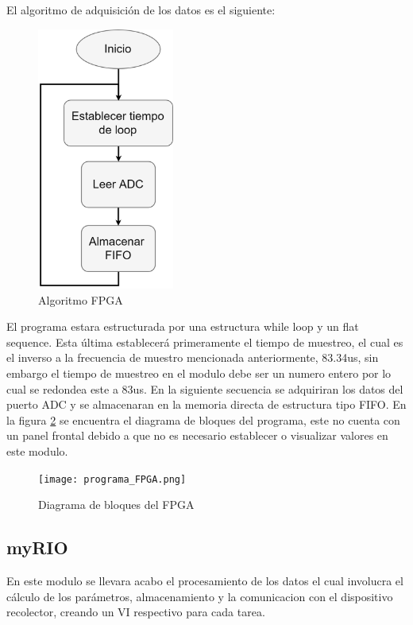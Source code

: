     \par El algoritmo de adquisición de los datos es el siguiente:
    \begin{figure}[H]
        \centering
        \includegraphics[width=0.4\textwidth]{../Imagenes/Algoritmo_FPGA.png}
        \caption{Algoritmo FPGA}
        \label{fig:Algo_FPGA}
    \end{figure}

    \par El programa estara estructurada por una estructura while loop y un flat sequence. Esta última establecerá primeramente el tiempo de muestreo, el cual es el inverso a la frecuencia de muestro mencionada anteriormente, 83.34us, sin embargo el tiempo de muestreo en el modulo debe ser un numero entero por lo cual se redondea este a 83us. En la siguiente secuencia se adquiriran los datos del puerto ADC y se almacenaran en la memoria directa de estructura tipo FIFO. En la figura \ref{fig:DB_FPGA} se encuentra el diagrama de bloques del programa, este no cuenta con un panel frontal debido a que no es necesario establecer o visualizar valores en este modulo.

    \begin{figure}[H]
        \centering
        \texttt{[image: programa\_FPGA.png]}
        \caption{Diagrama de bloques del FPGA}
        \label{fig:DB_FPGA}
    \end{figure}

  \subsection{myRIO}
    \par En este modulo se llevara acabo el procesamiento de los datos el cual involucra el cálculo de los parámetros, almacenamiento y la comunicacion con el dispositivo recolector, creando un VI respectivo para cada tarea.
